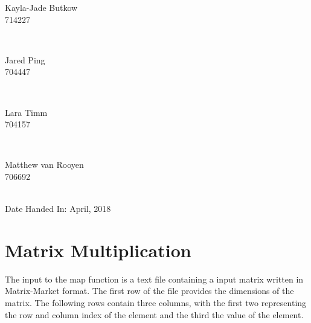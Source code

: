 \documentclass[10pt,twocolumn]{witseiepaper}
\begin{document}
\begin{titlepage}
		
		\begin{minipage}{0.4\textwidth}
			\begin{flushleft} \large
				Kayla-Jade Butkow \\ 714227 %
			\end{flushleft}
		\end{minipage}
		~
		\begin{minipage}{0.4\textwidth}
			\begin{flushright} \large
				Jared Ping \\ 704447
			\end{flushright}
		\end{minipage}\\[1cm]
		
		\begin{minipage}{0.4\textwidth}
			\begin{flushleft} \large
				Lara Timm \\ 704157
			\end{flushleft}
		\end{minipage}
		~
		\begin{minipage}{0.4\textwidth}
			\begin{flushright} \large
				Matthew van Rooyen \\ 706692
			\end{flushright}
		\end{minipage}\\[1cm]
		
		
		
		{\large Date Handed In:  April, 2018}\\[1cm] 
		
	\end{titlepage}


\pagestyle{plain}
\setcounter{page}{1}
\onecolumn
%
\section{Matrix Multiplication}

The input to the map function is a text file containing a input matrix written in Matrix-Market format. The first row of the file provides the dimensions of the matrix. The following rows contain three columns, with the first two representing the row and column index of the element and the third the value of the element.
\end{document}
